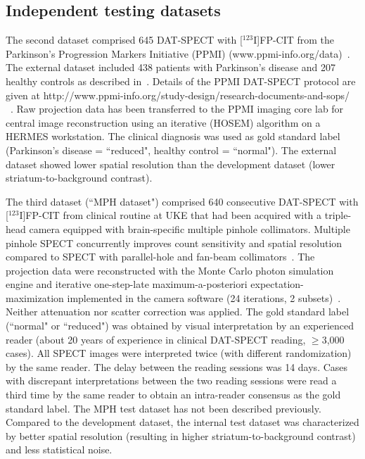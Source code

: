 \subsection{Independent testing datasets}
\label{subsec:external_dataset}

The second dataset comprised 645 DAT-SPECT with [$^{123}$I]FP-CIT from the Parkinson's Progression Markers Initiative (PPMI) 
(www.ppmi-info.org/data)~\citep{Parkinson_Progression_Marker_Initiative2011-px}.
The external dataset included 438 patients with Parkinson's disease and 207 healthy controls as described in~\cite{Wenzel2019}.
Details of the PPMI DAT-SPECT protocol are given at http://www.ppmi-info.org/study-design/research-documents-and-sops/ ~\citep{Parkinson_Progression_Marker_Initiative2011-px}. 
Raw projection data has been transferred to the PPMI imaging core lab for central image reconstruction using an iterative (HOSEM) algorithm on a HERMES workstation. 
The clinical diagnosis was used as gold standard label (Parkinson's disease = ``reduced", healthy control = ``normal"). 
The external dataset showed lower spatial resolution than the development dataset (lower striatum-to-background contrast).

The third dataset (``MPH dataset") comprised 640 consecutive DAT-SPECT with [$^{123}$I]FP-CIT from clinical routine at UKE 
that had been acquired with a triple-head camera equipped with brain-specific multiple pinhole collimators. 
Multiple pinhole SPECT concurrently improves count sensitivity and spatial resolution compared to SPECT with parallel-hole 
and fan-beam collimators~\citep{Mathies2022-yi, Tecklenburg2020-xr}.
The projection data were reconstructed with the Monte Carlo photon simulation engine 
and iterative one-step-late maximum-a-posteriori expectation-maximization implemented 
in the camera software (24 iterations, 2 subsets)~\citep{Tecklenburg2020-xr, Magdics2010}.
Neither attenuation nor scatter correction was applied. 
The gold standard label (``normal" or ``reduced") was obtained by visual interpretation by an experienced reader 
(about 20 years of experience in clinical DAT-SPECT reading, $\geq$3,000 cases).
All SPECT images were interpreted twice (with different randomization) by the same reader. 
The delay between the reading sessions was 14 days. 
Cases with discrepant interpretations between the two reading sessions were read a third time by the same reader 
to obtain an intra-reader consensus as the gold standard label. 
The MPH test dataset has not been described previously.
Compared to the development dataset, the internal test dataset was characterized by better spatial resolution 
(resulting in higher striatum-to-background contrast) and less statistical noise. 
